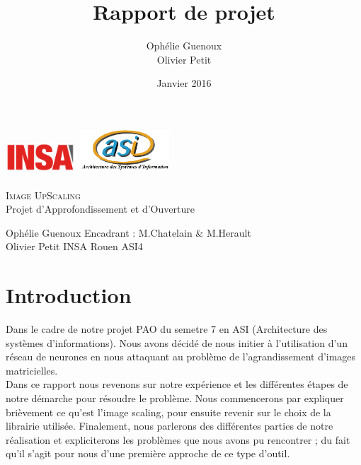 \documentclass[12pt, a4paper]{article}
\title{Rapport de projet}
\author{Ophélie Guenoux \\Olivier Petit}
\date{Janvier 2016}
\begin{document}
\makeatletter
\begin{titlepage}
  \begin{center}
      \includegraphics[width=0.20\textwidth]{Images/Logo_INSA.png}
      \hfill
      \includegraphics[width=0.25\textwidth]{Images/logoasi.png}\\
    \vspace{1cm}
		\Huge \underline{\@title} 
			\\ \textsc{Image UpScaling}
			\\ \Large Projet d'Approfondissement et d'Ouverture
			\vspace{1cm}
			\begin{figure}[h!]
				\centering
			\end{figure}
	\vspace{1cm}
	\end{center}
	\raggedright
	\large Ophélie Guenoux \hfill Encadrant : M.Chatelain \& M.Herault
	\\Olivier Petit \hfill INSA Rouen ASI4
	
\end{titlepage}

\newpage
\tableofcontents
\newpage

\vspace*{5cm}

\section*{Introduction}

Dans le cadre de notre projet PAO du semetre 7 en ASI (Architecture des systèmes d'informations). Nous avons décidé de nous initier à l'utilisation d'un réseau de neurones en nous attaquant au problème de l'agrandissement d'images matricielles.
\\

Dans ce rapport nous revenons sur notre expérience et les différentes étapes de notre démarche pour résoudre le problème. Nous commencerons par expliquer brièvement ce qu'est l'image scaling, pour ensuite revenir sur le choix de la librairie utilisée. Finalement, nous parlerons des différentes parties de notre réalisation et expliciterons les problèmes que nous avons pu rencontrer ; du fait qu'il s'agit pour nous d'une première approche de ce type d'outil.
\end{document}

